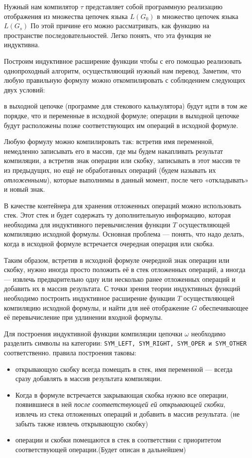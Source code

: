 Нужный нам компилятор $\tau$ представляет собой программную реализацию отображения из
множества цепочек языка $L(G_0)$ в множество цепочек языка $L(G_s)$ По этой причине его можно
рассматривать, как функцию на пространстве последовательностей. Легко понять,
что эта функция не индуктивна.

Построим индуктивное расширение  функции  чтобы с его помощью реализовать
однопроходный алгоритм, осуществляющий нужный нам перевод. Заметим, что любую
правильную формулу можно откомпилировать с соблюдением следующих двух условий:
\begin{itemize}
 в выходной цепочке (программе для стекового калькулятора) будут идти
в том же порядке, что и переменные в исходной формуле;
 операции в выходной цепочке будут расположены позже соответствующих им
операций в исходной формуле.
\end{itemize}

Любую формулу можно компилировать так: встретив имя переменной, немедленно
записывать его в массив, где мы будем накапливать результат компиляции, а
встретив знак операции или скобку, записывать в этот массив те из предыдущих,
но ещё не обработанных операций (будем называть их \emph{отложенными}), которые
выполнимы в данный момент, после чего «откладывать» и новый знак.

В качестве контейнера для хранения отложенных операций можно использовать стек.
Этот стек и будет содержать ту дополнительную информацию, которая необходима для
индуктивного перевычисления функции $T$ осуществляющей компиляцию исходной формулы.
Основная проблема — понять, что надо делать, когда в исходной формуле встречается
очередная операция или скобка.

Таким образом, встретив в исходной формуле очередной знак операции или скобку,
нужно иногда просто положить её в стек отложенных операций, а иногда — извлечь
предварительно одну или несколько ранее отложенных операций и добавить их в
массив результата. С точки зрения теории индуктивных функций необходимо построить
индуктивное расширение функции $T$ осуществляющей компиляцию исходной формулы, и
найти для неё отображение $G$ обеспечивающее её перевычисление при удлинении входной формулы.

Для построения индуктивной функции компиляции цепочки $\omega$ необходимо разделить
символы на категории: \verb|SYM_LEFT, SYM_RIGHT, SYM_OPER и SYM_OTHER| соответственно.
правила построения таковы:
\begin{itemize}
  \item открывающую скобку всегда помещать в стек, имя переменной --- всегда
  сразу добавлять в массив результата компиляции.
  \item Когда в формуле встречается закрывающая скобка нужно все операции,
  появившиеся в ней \emph{после соответствующей ей открывающей скобки}, извлечь
  из стека отложенных операций и добавить в массив результата.
  (не забыть также извлечь открывающую скобку)
  \item операции и скобки помещаются в стек в соответствии с приоритетом
  соответствующей операции.(Будет описан в дальнейшем)
\end{itemize}

